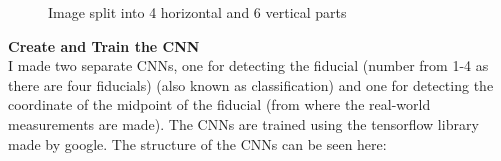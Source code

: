 \begin{figure}[H]
    \centering
    \caption{Image split into 4 horizontal and 6 vertical parts}\label{fig:figure}
\end{figure}
\textbf{Create and Train the CNN}\\
I made two separate CNNs, one for detecting the fiducial (number from 1-4 as there are four fiducials) (also known as classification) and one for detecting the coordinate of the midpoint of the fiducial (from where the real-world measurements are made).
The CNNs are trained using the tensorflow\autocite{tf} library made by google.
The structure of the CNNs can be seen here:
